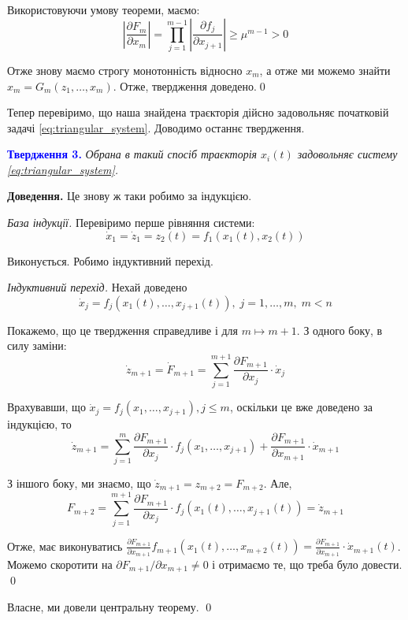 \documentclass[oneside,solution]{karazin-control-assign}
\begin{document}
Використовуючи умову теореми, маємо:
\begin{equation}
    \left|\frac{\partial F_m}{\partial x_m}\right| = \prod_{j=1}^{m-1} \left|\frac{\partial f_j}{\partial x_{j+1}}\right| \geq \mu^{m-1} > 0
\end{equation}

Отже знову маємо строгу монотонність відносно $x_m$, а отже ми можемо знайти $x_m = G_m(z_1,\dots,x_m)$. Отже, твердження доведено.\qed

Тепер перевіримо, що наша знайдена траєкторія дійсно задовольняє початковій задачі \ref{eq:triangular_system}. Доводимо останнє твердження.

\textcolor{blue}{\textbf{Твердження 3.}} \textit{Обрана в такий спосіб траєкторія $x_i(t)$ задовольняє систему \ref{eq:triangular_system}.}

\textbf{Доведення.} Це знову ж таки робимо за індукцією.

\textit{База індукції.} Перевіримо перше рівняння системи:
\begin{equation}
    \dot{x}_1 = \dot{z}_1 = z_2(t) = f_1(x_1(t), x_2(t))
\end{equation}

Виконується. Робимо індуктивний перехід.

\textit{Індуктивний перехід.} Нехай доведено
\begin{equation}
    \dot{x}_j = f_j(x_1(t), \dots, x_{j+1}(t)), \; j = 1,\dots,m, \; m < n
\end{equation}

Покажемо, що це твердження справедливе і для $m \mapsto m+1$. З одного боку, в силу заміни:
\begin{equation}
    \dot{z}_{m+1} = \dot{F}_{m+1} = \sum_{j=1}^{m+1} \frac{\partial F_{m+1}}{\partial x_j} \cdot \dot{x}_j
\end{equation}

Врахувавши, що $\dot{x}_j = f_j(x_1,\dots,x_{j+1}), j \leq m$, оскільки це вже доведено за індукцією, то
\begin{equation}
    \dot{z}_{m+1} = \sum_{j=1}^{m} \frac{\partial F_{m+1}}{\partial x_j} \cdot f_j(x_1,\dots,x_{j+1}) + \frac{\partial F_{m+1}}{\partial x_{m+1}} \cdot \dot{x}_{m+1}
\end{equation}

З іншого боку, ми знаємо, що $\dot{z}_{m+1}=z_{m+2}=F_{m+2}$. Але,
\begin{equation}
    F_{m+2} = \sum_{j=1}^{m+1} \frac{\partial F_{m+1}}{\partial x_j} \cdot f_{j}(x_1(t), \dots, x_{j+1}(t)) = \dot{z}_{m+1}
\end{equation}

Отже, має виконуватись $\frac{\partial F_{m+1}}{\partial x_{m+1}}f_{m+1}(x_1(t),\dots,x_{m+2}(t)) = \frac{\partial F_{m+1}}{\partial x_{m+1}} \cdot \dot{x}_{m+1}(t)$. Можемо скоротити на $\partial F_{m+1}/\partial x_{m+1} \neq 0$ і отримаємо те, що треба було довести. \qed

Власне, ми довели центральну теорему. \qed
\end{document}
